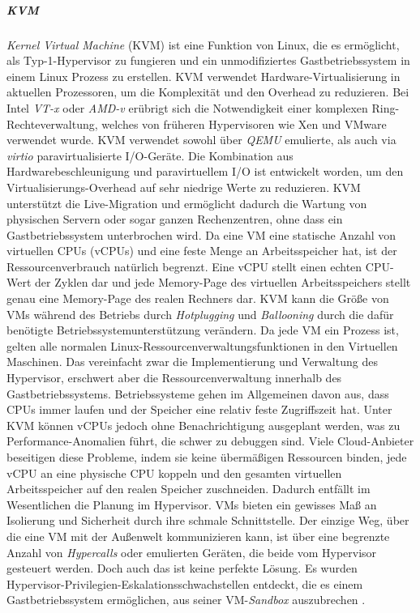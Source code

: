 \subparagraph{KVM}
\emph{Kernel Virtual Machine} (KVM) ist eine Funktion von Linux, die es ermöglicht, als Typ-1-Hypervisor zu fungieren und ein unmodifiziertes Gastbetriebssystem in einem Linux Prozess zu erstellen. KVM verwendet Hardware-Virtualisierung in aktuellen Prozessoren, um die Komplexität und den Overhead zu reduzieren. Bei Intel \emph{VT-x} oder \emph{AMD-v} erübrigt sich die Notwendigkeit einer komplexen Ring-Rechteverwaltung, welches von früheren Hypervisoren wie Xen und VMware verwendet wurde. KVM verwendet sowohl über \emph{QEMU} \cite{QEMUEmulator} emulierte, als auch via \emph{virtio} \cite{View2018VirtioVirtio} paravirtualisierte I/O-Geräte. Die Kombination aus Hardwarebeschleunigung und paravirtuellem I/O ist entwickelt worden, um den Virtualisierungs-Overhead auf sehr niedrige Werte zu reduzieren. KVM unterstützt die Live-Migration und ermöglicht dadurch die Wartung von physischen Servern oder sogar ganzen Rechenzentren, ohne dass ein Gastbetriebssystem unterbrochen wird. Da eine VM eine statische Anzahl von virtuellen CPUs (vCPUs) und eine feste Menge an Arbeitsspeicher hat, ist der Ressourcenverbrauch natürlich begrenzt. Eine vCPU stellt einen echten CPU-Wert der Zyklen dar und jede Memory-Page des virtuellen Arbeitsspeichers stellt genau eine Memory-Page des realen Rechners dar. KVM kann die Größe von VMs während des Betriebs durch \emph{Hotplugging} und \emph{Ballooning} durch die dafür benötigte Betriebssystemunterstützung verändern. Da jede VM ein Prozess ist, gelten alle normalen Linux-Ressourcenverwaltungsfunktionen in den Virtuellen Maschinen. Das vereinfacht zwar die Implementierung und Verwaltung des Hypervisor, erschwert aber die Ressourcenverwaltung innerhalb des Gastbetriebssystems. Betriebssysteme gehen im Allgemeinen davon aus, dass CPUs immer laufen und der Speicher eine relativ feste Zugriffszeit hat. Unter KVM können vCPUs jedoch ohne Benachrichtigung ausgeplant werden, was zu Performance-Anomalien führt, die schwer zu debuggen sind. Viele Cloud-Anbieter beseitigen diese Probleme, indem sie keine übermäßigen Ressourcen binden, jede vCPU an eine physische CPU koppeln und den gesamten virtuellen Arbeitsspeicher auf den realen Speicher zuschneiden. Dadurch entfällt im Wesentlichen die Planung im Hypervisor. VMs bieten ein gewisses Maß an Isolierung und Sicherheit durch ihre schmale Schnittstelle. Der einzige Weg, über die eine VM mit der Außenwelt kommunizieren kann, ist über eine begrenzte Anzahl von \emph{Hypercalls} oder emulierten Geräten, die beide vom Hypervisor gesteuert werden. Doch auch das ist keine perfekte Lösung. Es wurden Hypervisor-Privilegien-Eskalationsschwachstellen entdeckt, die es einem Gastbetriebssystem ermöglichen, aus seiner VM-\emph{Sandbox} auszubrechen \cite{Felter2014IBMContainers}.

